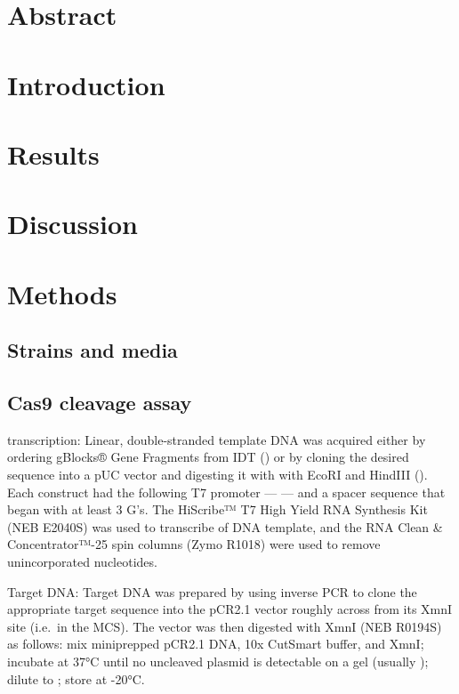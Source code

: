 \documentclass[10pt,oneside]{article}
\begin{document}
\section{Abstract}

\section{Introduction}

\section{Results}

\section{Discussion}

\section{Methods}

\subsection{Strains and media}

\subsection{\Invitro{} Cas9 cleavage assay}

\Invitro{} transcription: Linear, double-stranded template DNA was acquired 
either by ordering gBlocks® Gene Fragments from IDT () or by cloning 
the desired sequence into a pUC vector and digesting it with with EcoRI and 
HindIII ().  Each construct had the following T7 promoter --- 
 --- and a spacer sequence that began with at 
least 3 G's.  The HiScribe™ T7 High Yield RNA Synthesis Kit (NEB E2040S) was 
used to transcribe  of DNA template, and the RNA Clean \& 
Concentrator™-25 spin columns (Zymo R1018) were used to remove unincorporated 
nucleotides.

Target DNA: Target DNA was prepared by using inverse PCR to clone the 
appropriate target sequence into the pCR2.1 vector roughly across from its XmnI 
site (i.e.\ in the MCS).  The vector was then digested with XmnI (NEB R0194S) 
as follows: mix   miniprepped pCR2.1 DNA,  10x 
CutSmart buffer, and   XmnI; incubate at 37°C until no 
uncleaved plasmid is detectable on a gel (usually ); dilute to 
; store at -20°C.  
\end{document}

